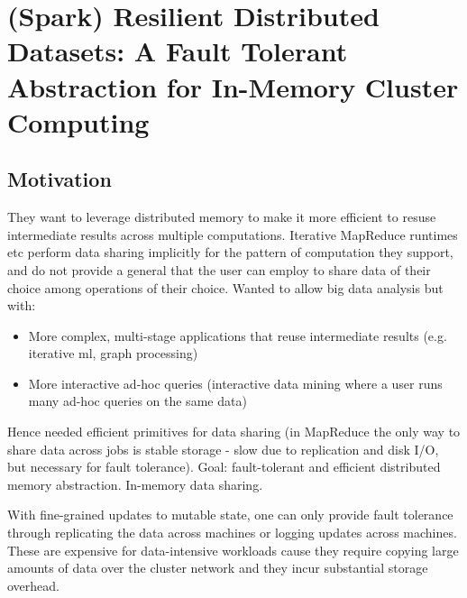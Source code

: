 \chapter{(Spark) Resilient Distributed Datasets: A Fault Tolerant Abstraction for In-Memory Cluster Computing}

\section{Motivation}
They want to leverage distributed memory to make it more efficient to resuse intermediate results across multiple computations. Iterative MapReduce runtimes etc perform data sharing implicitly for the pattern of computation they support, and do not provide a general that the user can employ to share data of their choice among operations of their choice.
Wanted to allow big data analysis but with:
\begin{itemize}
    \item More complex, multi-stage applications that reuse intermediate results (e.g. iterative ml, graph processing)
    \item More interactive ad-hoc queries (interactive data mining where a user runs many ad-hoc queries on the same data)
\end{itemize}
Hence needed efficient primitives for data sharing (in MapReduce the only way to share data across jobs is stable storage - slow due to replication and disk I/O, but necessary for fault tolerance).
Goal: fault-tolerant and efficient distributed memory abstraction.
In-memory data sharing.

With fine-grained updates to mutable state, one can only provide fault tolerance through replicating the data across machines or logging updates across machines. These are expensive for data-intensive workloads cause they require copying large amounts of data over the cluster network and they incur substantial storage overhead.

